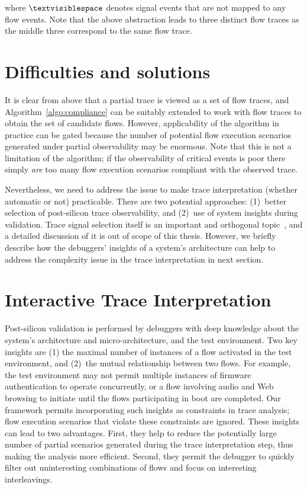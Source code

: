 \documentclass[12pt,frontmatter,copyright,thesis]{usfmanus}
\begin{document}
where $\textvisiblespace$ denotes signal events that are not
mapped to any flow events.  Note that the above abstraction
leads to three distinct flow traces as the middle three
correspond to the same flow trace.

\section{Difficulties and solutions}
It is clear from above that a partial trace is viewed as a
set of flow traces, and Algorithm~\ref{algo:compliance} can
be suitably extended to work with flow traces to obtain the
set of candidate flows.  However, applicability of the
algorithm in practice can be gated because the number of
potential flow execution scenarios generated under partial
observability may be enormous.  Note that this is not a
limitation of the algorithm; if the observability of
critical events is poor there simply {\em are} too many flow
execution scenarios compliant with the observed trace.

Nevertheless, we need to address the issue to make trace
interpretation (whether automatic or not) practicable.
There are two potential approaches: (1)~better selection of
post-silicon trace observability, and (2)~use of system
insights during validation.  Trace signal selection itself
is an important and orthogonal topic~\cite{nicolici,basu},
and a detailed discussion of it is out of scope of this
thesis.  However, we briefly describe how the debuggers'
insights of a system's architecture can help to address the
complexity issue in the trace interpretation in next section.

\section{Interactive Trace Interpretation}

Post-silicon validation is performed by debuggers with deep
knowledge about the system's architecture and
micro-architecture, and the test environment.  Two key
insights are (1) the maximal number of instances of a flow
activated in the test environment, and (2)~the mutual
relationship between two flows.  For example, the test
environment may not permit multiple instances of firmware
authentication to operate concurrently, or a flow involving
audio and Web browsing to initiate until the flows
participating in boot are completed.  Our framework permits
incorporating such insights as constraints in trace
analysis; flow execution scenarios that violate these
constraints are ignored.  These insights can lead to two
advantages.  First, they help to reduce the potentially
large number of partial scenarios generated during the trace
interpretation step, thus making the analysis more
efficient.  Second, they permit the debugger to quickly
filter out uninteresting combinations of flows and focus on
interesting interleavings.
\end{document}
